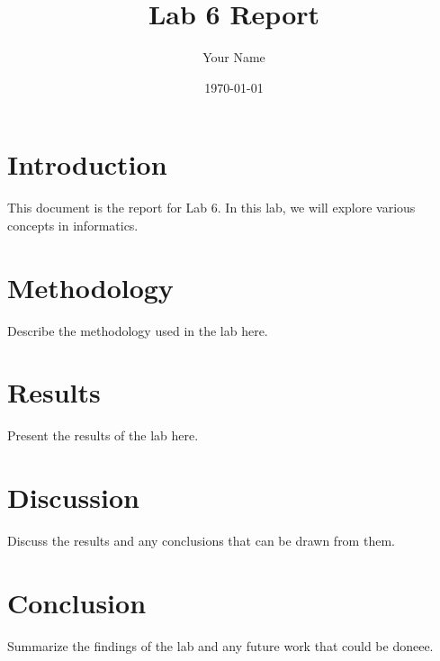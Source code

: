 \documentclass{article}
\title{Lab 6 Report}
\author{Your Name}
\date{\today}
\begin{document}
\maketitle

\section{Introduction}
This document is the report for Lab 6. In this lab, we will explore various concepts in informatics.

\section{Methodology}
Describe the methodology used in the lab here.

\section{Results}
Present the results of the lab here.

\section{Discussion}
Discuss the results and any conclusions that can be drawn from them.

\section{Conclusion}
Summarize the findings of the lab and any future work that could be doneee.
\end{document}
